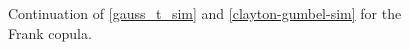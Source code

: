 \begin{figure}[!ht]
	\hfill
	\caption[\textsc{Simulation results for Frank copula}]{Continuation of \ref{gauss_t_sim} and \ref{clayton-gumbel-sim} for the Frank copula.}
	\label{frank-sim}
\end{figure}

